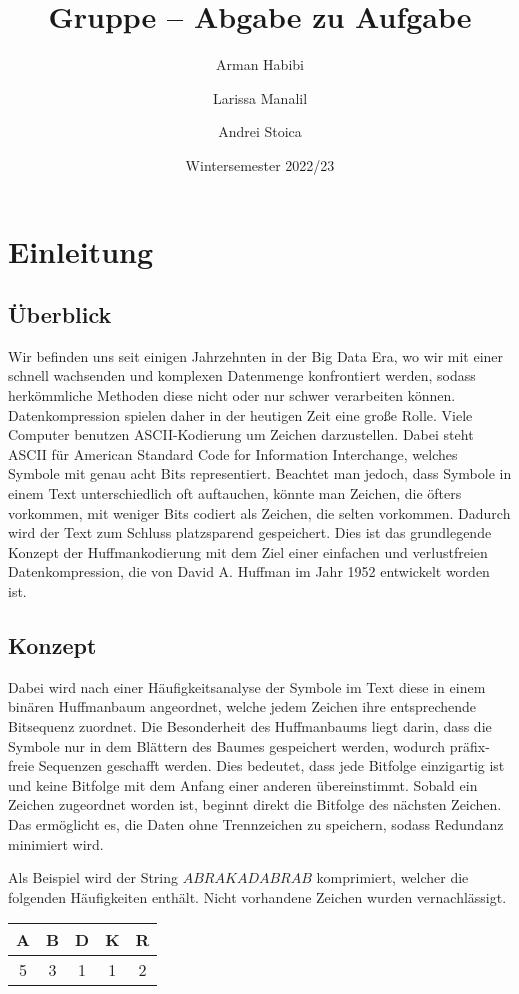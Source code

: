 \documentclass[course=erap]{aspdoc}
\author{Arman Habibi \and Larissa Manalil \and Andrei Stoica}
\date{Wintersemester 2022/23} %
\title{Gruppe \theGroup{} -- Abgabe zu Aufgabe \theNumber}
\begin{document}
\maketitle

\section{Einleitung}
\subsection{Überblick}

Wir befinden uns seit einigen Jahrzehnten in der Big Data Era, wo wir mit einer schnell wachsenden und komplexen Datenmenge konfrontiert werden, sodass herkömmliche Methoden diese nicht oder nur schwer verarbeiten können. Datenkompression spielen daher in der heutigen Zeit eine große Rolle. Viele Computer benutzen ASCII-Kodierung%
 um Zeichen darzustellen. Dabei steht ASCII für American Standard Code for Information Interchange, welches Symbole mit genau acht Bits representiert. Beachtet man jedoch, dass Symbole in einem Text unterschiedlich oft auftauchen, könnte man Zeichen, die öfters vorkommen, mit weniger Bits codiert als Zeichen, die selten vorkommen. Dadurch wird der Text zum Schluss platzsparend gespeichert.
Dies ist das grundlegende Konzept der Huffmankodierung mit dem Ziel einer einfachen und verlustfreien Datenkompression, die von David A. Huffman im Jahr 1952 entwickelt worden ist.
\subsection{Konzept}
Dabei wird nach einer Häufigkeitsanalyse der Symbole im Text diese in einem binären Huffmanbaum angeordnet, welche jedem Zeichen ihre entsprechende Bitsequenz zuordnet. Die Besonderheit des Huffmanbaums liegt darin, dass die Symbole nur in dem Blättern des Baumes gespeichert werden, wodurch präfix-freie Sequenzen geschafft werden.
Dies bedeutet, dass jede Bitfolge einzigartig ist und keine Bitfolge mit dem Anfang einer anderen übereinstimmt. Sobald ein Zeichen zugeordnet worden ist, beginnt direkt die Bitfolge des nächsten Zeichen. Das ermöglicht es, die Daten ohne Trennzeichen zu speichern, sodass Redundanz minimiert wird.

Als Beispiel wird der String $ABRAKADABRAB$ komprimiert, welcher die folgenden Häufigkeiten enthält. Nicht vorhandene Zeichen wurden vernachlässigt.

\begin{center}
    \begin{tabular}{ |c|c|c|c|c| }
     \hline
     A & B & D & K & R \\
     \hline
     5 & 3 & 1 & 1 & 2 \\
     \hline
    \end{tabular}
\end{center}
\end{document}
